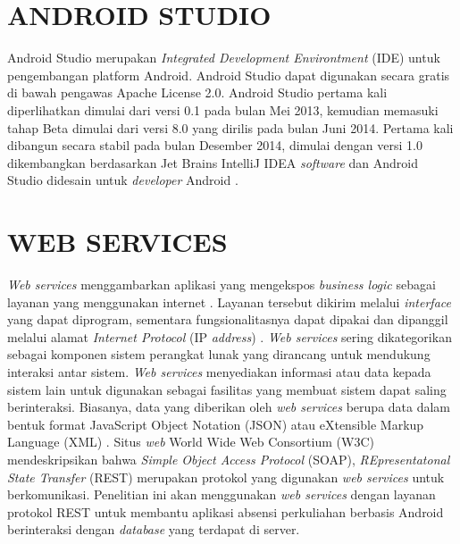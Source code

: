 \section{\uppercase{ANDROID STUDIO}}
Android Studio merupakan \textit{Integrated Development Environtment} (IDE) untuk pengembangan platform Android. Android Studio dapat digunakan secara gratis di bawah pengawas Apache License 2.0. Android Studio pertama kali diperlihatkan dimulai dari versi 0.1 pada bulan Mei 2013, kemudian memasuki tahap Beta dimulai dari versi 8.0 yang dirilis pada bulan Juni 2014. Pertama kali dibangun secara stabil pada bulan Desember 2014, dimulai dengan versi 1.0 dikembangkan berdasarkan Jet Brains IntelliJ IDEA \textit{software} dan Android Studio didesain untuk \textit{developer} Android \citep{Singh2016}.

\section{\uppercase{WEB SERVICES}}
\textit{Web services} menggambarkan aplikasi yang mengekspos \textit{business logic} sebagai layanan yang menggunakan internet \citep{Mironela2009}. Layanan tersebut dikirim melalui \textit{interface} yang dapat diprogram, sementara fungsionalitasnya dapat dipakai dan dipanggil melalui alamat \textit{Internet Protocol} (IP \textit{address}) \citep{Wagh2012}. \textit{Web services} sering dikategorikan sebagai komponen sistem perangkat lunak yang dirancang untuk mendukung interaksi antar sistem. \textit{Web services} menyediakan informasi atau data kepada sistem lain untuk digunakan sebagai fasilitas yang membuat sistem dapat saling berinteraksi. Biasanya, data yang diberikan oleh \textit{web services} berupa data dalam bentuk format JavaScript Object Notation (JSON) atau eXtensible Markup Language (XML) \citep{Rahman2013}. Situs \textit{web} World Wide Web Consortium (W3C) mendeskripsikan  bahwa \textit{Simple Object Access Protocol} (SOAP), \textit{REpresentatonal State Transfer} (REST) merupakan protokol yang digunakan \textit{web services} untuk berkomunikasi. Penelitian ini akan menggunakan \textit{web services} dengan layanan protokol REST untuk membantu aplikasi absensi perkuliahan berbasis Android berinteraksi dengan \textit{database} yang terdapat di server.

